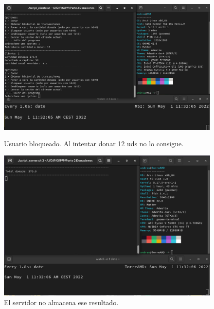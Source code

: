 \documentclass{article}
\begin{document}
\begin{figure}[H]
    \centering
    \begin{minipage}[H]{0.49\textwidth}
        \centering
        \includegraphics[width=\textwidth]{imagenes/multiples ordenadores/Cliente/Screenshot from 2022-05-01 11-32-08.png}
        \caption{Usuario bloqueado. Al intentar donar 12 uds no lo consigue.}
    \end{minipage}
    \hfill
    \begin{minipage}[H]{0.49\textwidth}
        \centering
        \includegraphics[width=\textwidth]{imagenes/multiples ordenadores/Servidor/Screenshot from 2022-05-01 11-32-09.png}
        \caption{El servidor no almacena ese resultado.}
    \end{minipage}
\end{figure}
\end{document}
